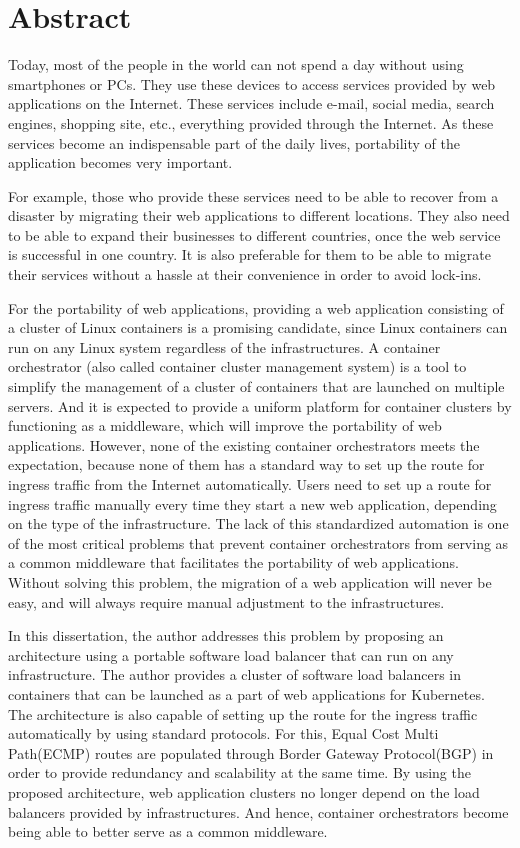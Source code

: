 \chapter*{Abstract}

Today, most of the people in the world can not spend a day without using smartphones or PCs.
They use these devices to access services provided by web applications on the Internet.
These services include e-mail, social media, search engines, shopping site, etc., everything provided through the Internet.
As these services become an indispensable part of the daily lives, portability of the application becomes very important.

For example, those who provide these services need to be able to recover from a disaster by migrating their web applications to different locations.
They also need to be able to expand their businesses to different countries, once the web service is successful in one country.
It is also preferable for them to be able to migrate their services without a hassle at their convenience in order to avoid lock-ins.

For the portability of web applications,
 providing a web application consisting of a cluster of Linux containers is a promising candidate, since Linux containers can run on any Linux system regardless of the infrastructures.
A container orchestrator (also called container cluster management system) is a tool to simplify the management of a cluster of containers that are launched on multiple servers.
And it is expected to provide a uniform platform for container clusters by functioning as a middleware, which will improve the portability of web applications.
However, none of the existing container orchestrators meets the expectation, because none of them has a standard way to set up the route for ingress traffic from the Internet automatically.
%
Users need to set up a route for ingress traffic manually every time they start a new web application, depending on the type of the infrastructure.
The lack of this standardized automation is one of the most critical problems that prevent container orchestrators from serving as a common middleware that facilitates the portability of web applications.
Without solving this problem, the migration of a web application will never be easy, and will always require manual adjustment to the infrastructures.

In this dissertation, the author addresses this problem by proposing an architecture using a portable software load balancer that can run on any infrastructure.
The author provides a cluster of software load balancers in containers that can be launched as a part of web applications for Kubernetes.
%
The architecture is also capable of setting up the route for the ingress traffic automatically by using standard protocols.
For this, Equal Cost Multi Path(ECMP) routes are populated through Border Gateway Protocol(BGP) in order to provide redundancy and scalability at the same time.
By using the proposed architecture, web application clusters no longer depend on the load balancers provided by infrastructures.
And hence, container orchestrators become being able to better serve as a common middleware.

